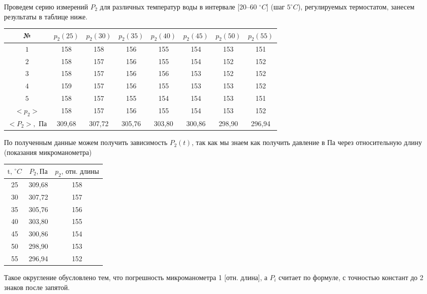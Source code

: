 \documentclass[a4paper,11.5pt]{article} %
\begin{document}
\bigskip

Проведем серию измерений $P_2$ для различных температур воды в интервале [20--60 $^\circ C$] (шаг $5^\circ C$), регулируемых термостатом, занесем результаты в таблице ниже.

\begin{center}
\begin{tabular}{|c|c|c|c|c|c|c|c|}
\hline
	№ & $p_2(25)$ & $p_2(30)$ & $p_2(35)$ & $p_2(40)$ & $p_2(45)$ & $p_2(50)$ & $p_2(55)$ 	\\
	\hline
	$1$ & 158 & 158 & 156 & 155 & 154 & 153 & 151 \\
	\hline
	$2$ & 158 & 157 & 156 & 155 & 154 & 152 & 152 \\
	\hline
	$3$ & 158 & 157 & 156 & 156 & 153 & 152 & 152 \\
	\hline
	$4$ & 159 & 157 & 156 & 155 & 153 & 153 & 152 \\
	\hline
	$5$ & 158 & 157 & 155 & 154 & 154 & 153 & 151 \\
	\hline
	$<p_2>$ & 158 & 157 & 156 & 155 & 154 & 153 & 152 \\
	\hline
	$<P_2>, \text{ Па}$ & 309,68 & 307,72 & 305,76 & 303,80 & 300,86 & 298,90 & 296,94 \\
	\hline
\end{tabular}
\end{center}

По полученным данные можем получить зависимость $P_2(t)$, так как мы знаем как получить давление в Па через относительную длину (показания микроманометра)

\begin{center}
\begin{tabular}{|c|c|c|}
	\hline
	$\text{t, }^\circ C$ & $P_2, \text{Па}$ & $p_2 \text{, отн. длины}$ \\
	\hline
	25 & 309,68 & 158 \\
	\hline
	30 & 307,72 & 157 \\
	\hline
	35 & 305,76 & 156 \\
	\hline
	40 & 303,80 & 155 \\
	\hline
	45 & 300,86 & 154 \\
	\hline
	50 & 298,90 & 153 \\
	\hline
	55 & 296,94 & 152 \\
	\hline
\end{tabular}
\end{center}

Такое округление обусловлено тем, что погрешность микроманометра 1 [отн. длина], а $P_i$ считает по формуле, с точностью констант до 2 знаков после запятой.
\end{document}
